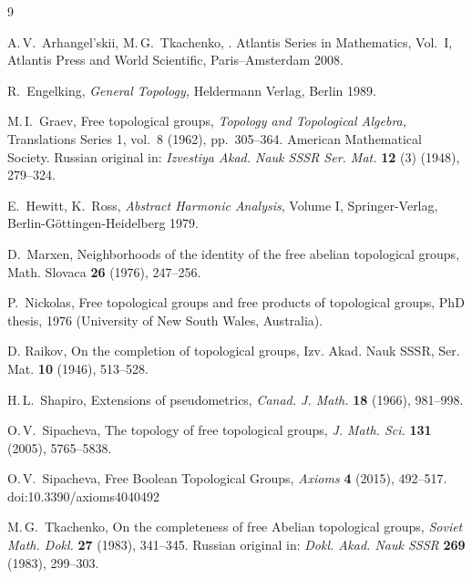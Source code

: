 \documentclass[a4paper,12pt]{amsart}
\theoremstyle{definition}
\begin{document}
\begin{thebibliography}{9}

 A.\,V.~Arhangel'skii, M.\,G.~Tkachenko,
.
\newblock Atlantis Series in Mathematics, Vol.~I,
Atlantis Press and World Scientific, Paris--Amsterdam 2008.

 R.~Engelking, 
\newblock \emph{General Topology,} Heldermann
Verlag, Berlin 1989.

 M.\,I.~Graev, 
\newblock Free topological groups, 
\textit{Topology and Topological Algebra,} Translations Series 1,
vol.~8 (1962), pp.~305--364.  American Mathematical Society. 
\newblock Russian original in: \textit{Izvestiya Akad. Nauk SSSR Ser. Mat.}
\textbf{12} (3) (1948), 279--324. 

 E.~Hewitt, K.~Ross, 
\newblock \emph{Abstract Harmonic Analysis}, Volume I,
\newblock Springer-Verlag, Berlin-G\"ottingen-Heidelberg 1979.

 D.~Marxen, 
Neighborhoods of the identity of the free abelian topological groups, 
Math. Slovaca \textbf{26} (1976), 247--256.

 P.~Nickolas,  
\newblock Free topological groups and free products of 
topological groups, 
\newblock PhD thesis, 1976 (University of New South Wales, Australia).

D. Raikov, 
\newblock On the completion of topological groups, 
\newblock Izv. Akad. Nauk SSSR, Ser. Mat. \textbf{10} (1946), 513--528.

H.\,L.~Shapiro,
\newblock Extensions of pseudometrics,
\newblock \emph{Canad. J. Math.} \textbf{18} (1966), 981--998.

 O.\,V.~Sipacheva, 
\newblock The topology of free topological groups,
\newblock \emph{J. Math. Sci.} \textbf{131} (2005), 5765--5838.

 O.\,V.~Sipacheva, 
\newblock Free Boolean Topological Groups, 
\newblock \emph{Axioms} \textbf{4} (2015), 492--517.
doi:10.3390/axioms4040492

 M.\,G.~Tkachenko, 
\newblock On the completeness of free Abelian topological groups, 
\newblock \emph{Soviet Math. Dokl.} \textbf{27} (1983), 341--345. 
\newblock Russian original in: \emph{Dokl. Akad. Nauk SSSR} 
\textbf{269} (1983), 299--303.

\end{thebibliography}
 
 
\end{document}
